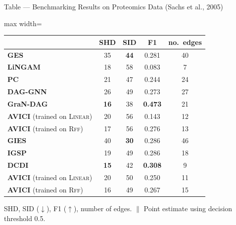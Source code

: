 \documentclass[aspectratio=169,10pt]{beamer}
\newcommand{\highlight}[1]{\textbf{#1}}
\newcommand{\domain}[1]{\textsc{#1}}
\newcommand{\lineardomain}{\domain{Linear}\xspace}
\newcommand{\rffdomain}{\domain{Rff}\xspace}
\newcommand{\ges}{\textbf{GES}}
\newcommand{\pc}{\textbf{PC}}
\newcommand{\lingam}{\textbf{LiNGAM}}
\newcommand{\daggnn}{\textbf{DAG-GNN}}
\newcommand{\grandag}{\textbf{GraN-DAG}}
\newcommand{\gies}{\textbf{GIES}}
\newcommand{\igsp}{\textbf{IGSP}}
\newcommand{\dcdi}{\textbf{DCDI}}
\newcommand{\ours}{AVICI\xspace}
\begin{document}
\begin{frame}{Table --- Benchmarking Results on Proteomics Data (Sachs et al., 2005)}
\small
\begin{adjustbox}{max width=\textwidth}
\begin{tabular}{lcccc}
\toprule
 & SHD & SID & F1 & no.\ edges   \\
\midrule
\ges                 &   35 & \highlight{44} & 0.281 & 40 \\
\lingam              &   18 & 58 & 0.083 &  7 \\
\pc                 & 21 & 47 & 0.244 & 24 \\
\daggnn              &   26 & 49 & 0.273 & 27 \\
\grandag              &  \highlight{16}   & 38  & \highlight{0.473} & 21 \\
\textbf{\ours} (trained on \lineardomain)\smash{${}^\|$} &   20 & 56 & 0.143 & 12 \\
\textbf{\ours} (trained on \rffdomain)\smash{${}^\|$}   &   17 & 56 & 0.276 & 13 \\
\midrule
\gies                &   40 & \highlight{30} & 0.286 & 46 \\
\igsp                &   19 & 49 & 0.286 & 18 \\
\dcdi                &   \highlight{15} & 42 & \highlight{0.308} &  9 \\
\textbf{\ours} (trained on \lineardomain)\smash{${}^\|$} &   20 & 50 & 0.250 & 11 \\
\textbf{\ours} (trained on \rffdomain)\smash{${}^\|$}   &   16 & 49 & 0.267 & 15 \\
\bottomrule
\end{tabular}
\end{adjustbox}

\vspace{0.2cm}
{\footnotesize SHD, SID ($\downarrow$), F1 ($\uparrow$), number of edges. $\|$ Point estimate using decision threshold \num{0.5}.}
\end{frame}
\end{document}
